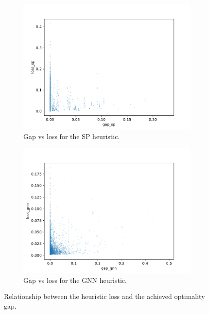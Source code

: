 \documentclass[english, 12pt, a4paper, sci, utf8, a-2b, online]{aaltothesis}
\begin{document}
\begin{figure}
    \begin{subfigure}{0.5\textwidth}
        \centering
        \includegraphics[width=\linewidth]{figures/gap-loss-trivial.pdf}
        \caption{Gap vs loss for the SP heuristic.}
        \label{fig:gap-loss-trivial}
    \end{subfigure}
    \begin{subfigure}{0.5\textwidth}
        \centering
        \includegraphics[width=\linewidth]{figures/gap-loss-gnn.pdf}
        \caption{Gap vs loss for the GNN heuristic.}
        \label{fig:gap-loss-gnn}
    \end{subfigure}
    \caption{Relationship between the heuristic loss and the achieved optimality gap.}
    \label{fig:gap-loss}
\end{figure}
\end{document}
